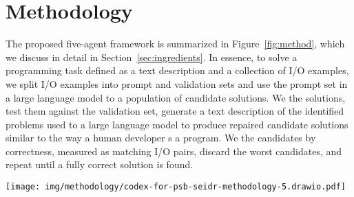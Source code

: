 \section{Methodology}
\label{sec:methodology}
The proposed five-agent \method{} framework is summarized in Figure~\ref{fig:method}, which we discuss in detail in Section~\ref{sec:ingredients}.
In essence, to solve a programming task defined as a text description and a collection of I/O examples, we split I/O examples into prompt and validation sets and use the prompt set in a large language model to \synthesize{} a population of candidate solutions.
We \execute{} the solutions, test them against the validation set, generate a text description of the identified problems used to \instruct{} a large language model to produce repaired candidate solutions similar to the way a human developer \debug{}s a program.
We \rank{} the candidates
by correctness, measured as matching I/O pairs, discard the worst candidates, and repeat until a fully correct solution is found.

\begin{figure*}[t]
    \centering
    \texttt{[image: img/methodology/codex-for-psb-seidr-methodology-5.drawio.pdf]}
    \caption{Overview of \method{}, a multi-agent iterative framework that uses LLMs to implement the Synthesize, Execute, Instruct, Debug, and Rank feedback loop.}
    \label{fig:method}
\end{figure*}
 

